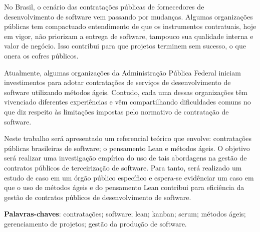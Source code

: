 \begin{resumo}
No Brasil, o cenário das contratações públicas de fornecedores de desenvolvimento de software vem passando por mudanças. Algumas organizações públicas tem compactuado entendimento de que os instrumentos contratuais, hoje em vigor, não priorizam a entrega de software, tampouco sua qualidade interna e valor de negócio. Isso contribui para que projetos terminem sem sucesso, o que onera os cofres públicos.

Atualmente, algumas organizações da Administração Pública Federal iniciam investimentos para adotar contratações de serviços de desenvolvimento de software utilizando métodos ágeis. Contudo, cada uma dessas organizações têm vivenciado diferentes experiências e vêm compartilhando dificuldades comuns no que diz respeito às limitações impostas pelo normativo de contratação de software.

Neste trabalho será apresentado um referencial teórico que envolve: contratações públicas brasileiras de software; o pensamento Lean e métodos ágeis. O objetivo será realizar uma investigação empírica do uso de tais abordagens na gestão de contratos públicos de terceirização de software. Para tanto, será realizado um estudo de caso em um órgão público específico e espera-se evidênciar um caso em que o uso de métodos ágeis e do pensamento Lean contribui para eficiência da gestão de contratos públicos de desenvolvimento de software.

\vspace{\onelineskip}
    
 \noindent
 \textbf{Palavras-chaves}: contratações; software; lean; kanban; scrum; métodos ágeis; gerenciamento de projetos; gestão da produção de software.
\end{resumo}
